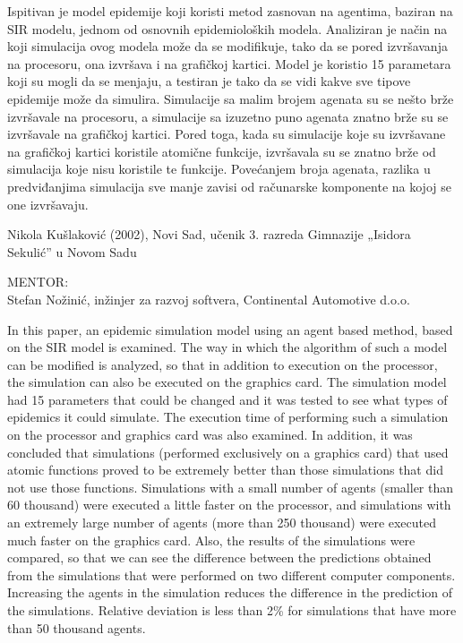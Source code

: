 \begin{Abstract}
Ispitivan je model epidemije koji koristi metod zasnovan na agentima, baziran na
SIR modelu, jednom od osnovnih epidemioloških modela. Analiziran je način na koji
simulacija ovog modela može da se modifikuje, tako da se pored izvršavanja na
procesoru, ona izvršava i na grafičkoj kartici. Model je koristio 15 parametara koji su
mogli da se menjaju, a testiran je tako da se vidi kakve sve tipove epidemije može da
simulira. Simulacije sa malim brojem agenata su se nešto brže izvršavale na procesoru,
a simulacije sa izuzetno puno agenata znatno brže su se izvršavale na grafičkoj kartici.
Pored toga, kada su simulacije koje su izvršavane na grafičkoj kartici koristile atomične
funkcije, izvršavala su se znatno brže od simulacija koje nisu koristile te funkcije.
Povećanjem broja agenata, razlika u predviđanjima simulacija sve manje zavisi od
računarske komponente na kojoj se one izvršavaju.
\end{Abstract}
\begin{AuthorEx}
Nikola Kušlaković (2002), Novi Sad, učenik 3. razreda Gimnazije „Isidora Sekulić” u Novom Sadu

MENTOR:\\
Stefan Nožinić, inžinjer za razvoj softvera, Continental Automotive d.o.o.
\end{AuthorEx}
\begin{AbstractEng}
In this paper, an epidemic simulation model using an agent based method, based
on the SIR model is examined. The way in which the algorithm of such a model can be
modified is analyzed, so that in addition to execution on the processor, the simulation
can also be executed on the graphics card. The simulation model had 15 parameters
that could be changed and it was tested to see what types of epidemics it could
simulate. The execution time of performing such a simulation on the processor and
graphics card was also examined. In addition, it was concluded that simulations
(performed exclusively on a graphics card) that used atomic functions proved to be
extremely better than those simulations that did not use those functions. Simulations
with a small number of agents (smaller than 60 thousand) were executed a little faster
on the processor, and simulations with an extremely large number of agents (more than
250 thousand) were executed much faster on the graphics card. Also, the results of the
simulations were compared, so that we can see the difference between the predictions
obtained from the simulations that were performed on two different computer
components. Increasing the agents in the simulation reduces the difference in the
prediction of the simulations. Relative deviation is less than 2\% for simulations that have
more than 50 thousand agents.
\end{AbstractEng}

